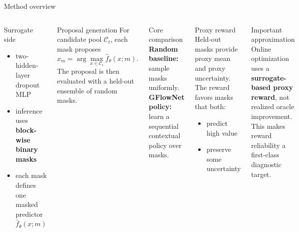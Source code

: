 \documentclass[aspectratio=169]{beamer}
\begin{document}
\begin{frame}{Method overview}
\vspace{-0.55em}
\begin{columns}[T,onlytextwidth]
\begin{minipage}[t][0.82\textheight]{\linewidth}\vspace{0pt}
  \begin{cardA}{Surrogate side}
  \begin{itemize}
    \item two-hidden-layer dropout MLP
    \item inference uses \textbf{block-wise binary masks}
    \item each mask defines one masked predictor $\hat f_\theta(x;m)$
  \end{itemize}
  \end{cardA}

  \vfill

  \begin{card}{Proposal generation}
  For candidate pool $\mathcal C_t$, each mask proposes
  \[
  x_m=\arg\max_{x\in\mathcal C_t}\hat f_\theta(x;m).
  \]
  The proposal is then evaluated with a held-out ensemble of random masks.
  \end{card}

  \vfill

  \begin{cardG}{Core comparison}
  \textbf{Random baseline:} sample masks uniformly.\\
  \textbf{GFlowNet policy:} learn a sequential contextual policy over masks.
  \end{cardG}
\end{minipage}

\begin{minipage}[t][0.82\textheight]{\linewidth}\vspace{0pt}
  \begin{card}{Proxy reward}
  Held-out masks provide proxy mean and proxy uncertainty. The reward favors masks that both:
  \begin{itemize}
    \item predict high value
    \item preserve some uncertainty
  \end{itemize}
  \end{card}

  \vfill

  \begin{cardW}{Important approximation}
  Online optimization uses a \textbf{surrogate-based proxy reward}, not realized oracle improvement. This makes reward reliability a first-class diagnostic target.
  \end{cardW}


\end{minipage}
\end{columns}
\end{frame}
\end{document}
